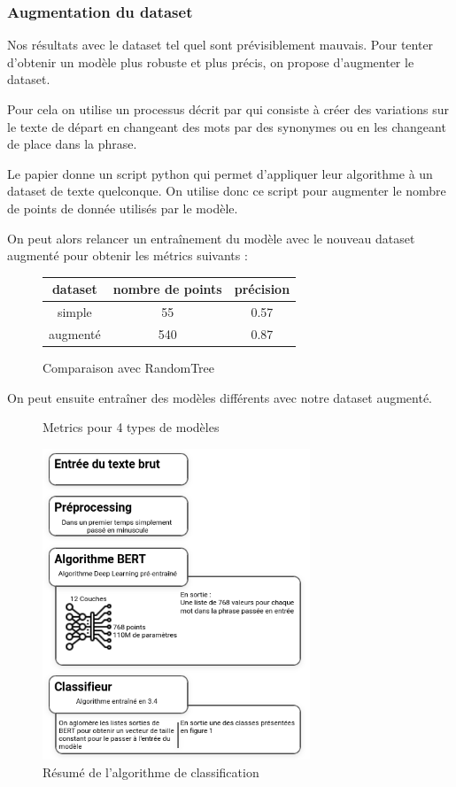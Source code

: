 \documentclass[oneside,a4paper,12pt]{article}
\begin{document}
	\subsubsection{Augmentation du dataset}
	\label{trainingFinal}
	Nos résultats avec le dataset tel quel sont prévisiblement mauvais. Pour tenter d'obtenir un modèle plus robuste et plus précis, on propose d'augmenter le dataset.
	
	Pour cela on utilise un processus décrit par \cite{wei-zou-2019-eda} qui consiste à créer des variations sur le texte de départ en changeant des mots par des synonymes ou en les changeant de place dans la phrase.
	
	Le papier \cite{wei-zou-2019-eda} donne un script python qui permet d'appliquer leur algorithme à un dataset de texte quelconque. On utilise donc ce script pour augmenter le nombre de points de donnée utilisés par le modèle.
	
	On peut alors relancer un entraînement du modèle avec le nouveau dataset augmenté pour obtenir les métrics suivants :
	
	\begin{figure}[h]
		\centering
		\begin{tabular}{|c|c|c|}
			\hline
			dataset & nombre de points & précision\\
			\hline
			simple & 55 & 0.57\\
			\hline
			augmenté & 540 & 0.87\\
			\hline
		\end{tabular}
		\caption{Comparaison avec RandomTree}
	\end{figure}

	On peut ensuite entraîner des modèles différents avec notre dataset augmenté.
	\newpage
	\begin{figure}[h]
		\centering
		
		\caption{Metrics pour 4 types de modèles}
	\end{figure}

	\begin{figure}[h]
		\centering
		\includegraphics[width=8cm]{algo.png}
		\caption{Résumé de l'algorithme de classification}
	\end{figure}
	
\end{document}
